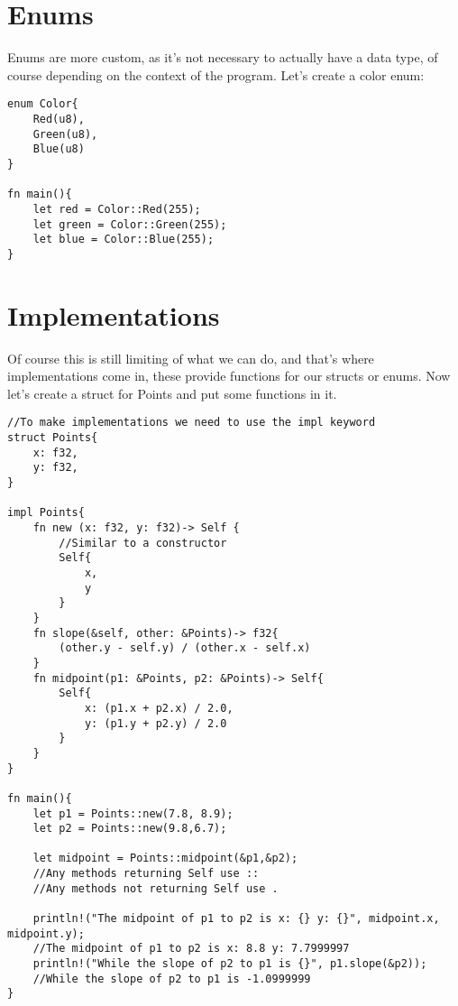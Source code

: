 \section{Enums}
\par Enums are more custom, as it's not necessary to actually have a data type, of course depending on the context of the program. Let's create a color enum: 


\begin{lstlisting}
enum Color{
    Red(u8), 
    Green(u8),
    Blue(u8)
}

fn main(){
    let red = Color::Red(255);
    let green = Color::Green(255);
    let blue = Color::Blue(255);
}    
\end{lstlisting}

\section{Implementations}
\par Of course this is still limiting of what we can do, and that's where implementations come in, these provide functions for our structs or enums. Now let's create a struct for Points and put some functions in it. 

\begin{lstlisting}
//To make implementations we need to use the impl keyword
struct Points{
    x: f32,
    y: f32,
}

impl Points{
    fn new (x: f32, y: f32)-> Self {
        //Similar to a constructor 
        Self{
            x,
            y
        }
    }
    fn slope(&self, other: &Points)-> f32{
        (other.y - self.y) / (other.x - self.x)
    }
    fn midpoint(p1: &Points, p2: &Points)-> Self{
        Self{
            x: (p1.x + p2.x) / 2.0, 
            y: (p1.y + p2.y) / 2.0
        }
    }
}

fn main(){
    let p1 = Points::new(7.8, 8.9);
    let p2 = Points::new(9.8,6.7);

    let midpoint = Points::midpoint(&p1,&p2);
    //Any methods returning Self use ::
    //Any methods not returning Self use .

    println!("The midpoint of p1 to p2 is x: {} y: {}", midpoint.x, midpoint.y);
    //The midpoint of p1 to p2 is x: 8.8 y: 7.7999997
    println!("While the slope of p2 to p1 is {}", p1.slope(&p2));
    //While the slope of p2 to p1 is -1.0999999
}    
\end{lstlisting}
